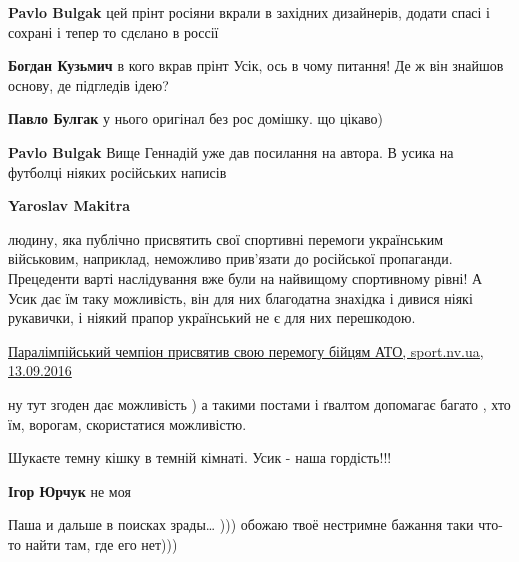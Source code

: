 \begin{itemize}
\begin{itemize}
\textbf{Pavlo Bulgak} цей прінт росіяни вкрали в західних дизайнерів, додати спасі і сохрані і тепер то сдєлано в россії

\textbf{Богдан Кузьмич} в кого вкрав прінт Усік, ось в чому питання! Де ж він знайшов основу, де підгледів ідею?

\textbf{Павло Булгак} у нього оригінал без рос домішку. що цікаво)

\textbf{Pavlo Bulgak} Вище Геннадій уже дав посилання на автора. В усика на футболці ніяких російських написів

\textbf{Yaroslav Makitra} 

людину, яка публічно присвятить свої спортивні перемоги українським військовим,
наприклад, неможливо прив'язати до російської пропаганди. Прецеденти варті
наслідування вже були на найвищому спортивному рівні! А Усик дає їм таку
можливість, він для них благодатна знахідка і дивися ніякі рукавички, і ніякий
прапор український не є для них перешкодою.

\href{https://sport.nv.ua/ukr/other-sport/paralimpijskij-chempion-prisvjativ-svoju-peremogu-bijtsjam-ato-219415.html}{%
Паралімпійський чемпіон присвятив свою перемогу бійцям АТО, sport.nv.ua, 13.09.2016%
}


ну тут згоден дає можливість ) а такими постами і ґвалтом допомагає багато ,
хто їм, ворогам, скористатися можливістю.

\end{itemize} %


Шукаєте темну кішку в темній кімнаті. Усик - наша гордість!!!

\begin{itemize} %
\textbf{Ігор Юрчук} не моя
\end{itemize} %


Паша и дальше в поисках зрады… ))) обожаю твоё нестримне бажання таки что-то
найти там, где его нет)))

\begin{itemize} %


\end{itemize}
\end{itemize}
